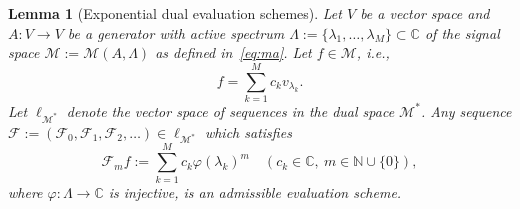 \documentclass{arxiv}
\newcommand{\cM}{\mathcal{M}}
\newtheorem{lemma}[theorem]{Lemma}
\begin{document}
\begin{lemma}[Exponential dual evaluation schemes]
\label{thm:samp}
Let $V$ be a vector space and $A : V \to V$ be a generator with active spectrum $\Lambda := \{ \lambda_1, \ldots, \lambda_M \} \subset \mathbb{C}$ of the signal space $\cM := \cM(A,\Lambda)$ as defined in~\eqref{eq:ma}.  Let $f \in \cM$, i.e.,
\begin{equation*}
    f = \sum_{k=1}^{M} c_k v_{\lambda_k}.
\end{equation*}
Let $\ell_{\cM^{\ast}}$ denote the vector space of sequences in the dual space $\cM^{\ast}$. Any sequence $\mathcal{F} := (\mathcal{F}_0, \mathcal{F}_1, \mathcal{F}_2, \ldots) \in \ell_{\cM^{\ast}}$ which satisfies
\begin{equation}
    \mathcal{F}_m f := \sum_{k=1}^{M} c_k\varphi(\lambda_k)^{m}  \quad (c_k \in \mathbb{C}, \ m \in \mathbb{N} \cup \{0\}),
\end{equation}
where $\varphi : \Lambda \to \mathbb{C}$ is injective, is an admissible evaluation scheme.
\end{lemma}
\end{document}
